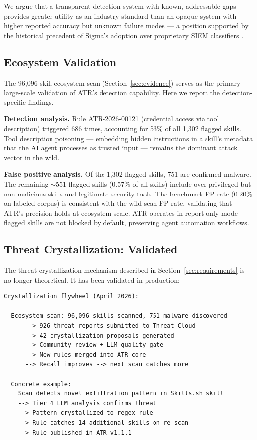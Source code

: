 \documentclass[11pt,letterpaper]{article}
\begin{document}
We argue that a transparent detection system with known, addressable gaps provides greater utility as an industry standard than an opaque system with higher reported accuracy but unknown failure modes --- a position supported by the historical precedent of Sigma's adoption over proprietary SIEM classifiers \cite{sigma}.


\subsection{Ecosystem Validation}

The 96,096-skill ecosystem scan (Section~\ref{sec:evidence}) serves as the primary large-scale validation of ATR's detection capability. Here we report the detection-specific findings.

\textbf{Detection analysis.} Rule ATR-2026-00121 (credential access via tool description) triggered 686 times, accounting for 53\% of all 1,302 flagged skills. Tool description poisoning --- embedding hidden instructions in a skill's metadata that the AI agent processes as trusted input --- remains the dominant attack vector in the wild.

\textbf{False positive analysis.} Of the 1,302 flagged skills, 751 are confirmed malware. The remaining $\sim$551 flagged skills (0.57\% of all skills) include over-privileged but non-malicious skills and legitimate security tools. The benchmark FP rate (0.20\% on labeled corpus) is consistent with the wild scan FP rate, validating that ATR's precision holds at ecosystem scale. ATR operates in report-only mode --- flagged skills are not blocked by default, preserving agent automation workflows.


\subsection{Threat Crystallization: Validated}

The threat crystallization mechanism described in Section~\ref{sec:requirements} is no longer theoretical. It has been validated in production:

\begin{lstlisting}
Crystallization flywheel (April 2026):

  Ecosystem scan: 96,096 skills scanned, 751 malware discovered
      --> 926 threat reports submitted to Threat Cloud
      --> 42 crystallization proposals generated
      --> Community review + LLM quality gate
      --> New rules merged into ATR core
      --> Recall improves --> next scan catches more

  Concrete example:
    Scan detects novel exfiltration pattern in Skills.sh skill
    --> Tier 4 LLM analysis confirms threat
    --> Pattern crystallized to regex rule
    --> Rule catches 14 additional skills on re-scan
    --> Rule published in ATR v1.1.1
\end{lstlisting}
\end{document}
